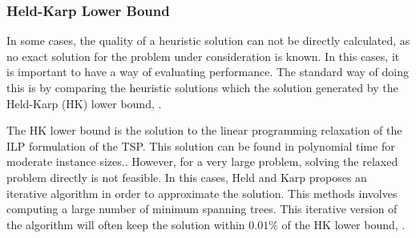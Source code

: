 
\subsubsection{Held-Karp Lower Bound}

In some cases, the quality of a heuristic solution can not be directly calculated,
as no exact solution for the problem under consideration is known.
In this cases, it is important to have a way of evaluating performance.
The standard way of doing this is by comparing the heuristic solutions
which the solution generated by the Held-Karp (HK) lower bound, \cite{held_karp_lb}.

The HK lower bound is the solution to the linear programming relaxation of
the ILP formulation of the TSP. This solution can be found in polynomial time for moderate instance sizes..
However, for a very large problem,
solving the relaxed problem directly is not feasible. In this cases, Held and Karp
proposes an iterative algorithm in order to approximate the solution. This methods
involves computing a large number of minimum spanning trees.
This iterative version of the algorithm will often keep the solution
within $0.01\%$ of the HK lower bound, \cite{heuristics_tsp}.
